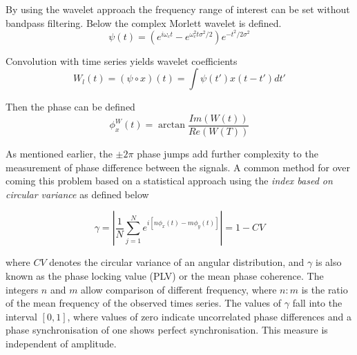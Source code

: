 \documentclass[]{article}
\begin{document}
By using the wavelet approach the frequency range of interest can be
set without bandpass filtering. Below the complex Morlett wavelet is
defined.
\begin{equation}
\psi(t) =
(e^{i\omega_ct}-e^{\omega_c^2t\sigma^2/2})e^{-t^2/2\sigma^2}
\end{equation}

Convolution with time series yields wavelet coefficients
\begin{equation}
W_l(t) = (\psi\circ x)(t) = \int\psi(t')x(t-t')dt'
\end{equation}

Then the phase can be defined
\begin{equation}
\phi_x^W(t)=\arctan\frac{Im(W(t))}{Re(W(T))}
\end{equation}

As mentioned earlier, the $\pm2\pi$ phase jumps add further
complexity to the measurement of phase difference between the
signals. A common method for over coming this problem based on a
statistical approach using the \emph{index based on circular
variance} as defined below

\begin{equation}
\gamma = |\frac{1}{N}\sum_{j=1}^N e^{i[n\phi_x(t)-m\phi_y(t)]}| =
1-CV
\end{equation}

where $CV$ denotes the circular variance of an angular distribution,
and $\gamma$ is also known as the phase locking value (PLV) or the
mean phase coherence. The integers $n$ and $m$ allow comparison of
different frequency, where $n:m$ is the ratio of the mean frequency
of the observed times series. The values of $\gamma$ fall into the
interval $[0,1]$, where values of zero indicate uncorrelated phase
differences and a phase synchronisation of one shows perfect
synchronisation. This measure is independent of amplitude.\\
\end{document}
